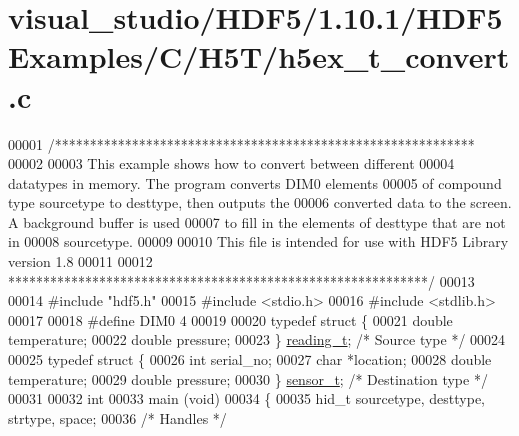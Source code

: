 \hypertarget{visual__studio_2_h_d_f5_21_810_81_2_h_d_f5_examples_2_c_2_h5_t_2h5ex__t__convert_8c_source}{}\section{visual\+\_\+studio/\+H\+D\+F5/1.10.1/\+H\+D\+F5\+Examples/\+C/\+H5\+T/h5ex\+\_\+t\+\_\+convert.c}
\label{visual__studio_2_h_d_f5_21_810_81_2_h_d_f5_examples_2_c_2_h5_t_2h5ex__t__convert_8c_source}

\begin{DoxyCode}
00001 \textcolor{comment}{/************************************************************}
00002 \textcolor{comment}{}
00003 \textcolor{comment}{  This example shows how to convert between different}
00004 \textcolor{comment}{  datatypes in memory.  The program converts DIM0 elements}
00005 \textcolor{comment}{  of compound type sourcetype to desttype, then outputs the}
00006 \textcolor{comment}{  converted data to the screen.  A background buffer is used}
00007 \textcolor{comment}{  to fill in the elements of desttype that are not in}
00008 \textcolor{comment}{  sourcetype.}
00009 \textcolor{comment}{}
00010 \textcolor{comment}{  This file is intended for use with HDF5 Library version 1.8}
00011 \textcolor{comment}{}
00012 \textcolor{comment}{ ************************************************************/}
00013 
00014 \textcolor{preprocessor}{#include "hdf5.h"}
00015 \textcolor{preprocessor}{#include <stdio.h>}
00016 \textcolor{preprocessor}{#include <stdlib.h>}
00017 
00018 \textcolor{preprocessor}{#define DIM0            4}
00019 
00020 \textcolor{keyword}{typedef} \textcolor{keyword}{struct }\{
00021     \textcolor{keywordtype}{double}  temperature;
00022     \textcolor{keywordtype}{double}  pressure;
00023 \} \hyperlink{structreading__t}{reading\_t};                                \textcolor{comment}{/* Source type */}
00024 
00025 \textcolor{keyword}{typedef} \textcolor{keyword}{struct }\{
00026     \textcolor{keywordtype}{int}     serial\_no;
00027     \textcolor{keywordtype}{char}    *location;
00028     \textcolor{keywordtype}{double}  temperature;
00029     \textcolor{keywordtype}{double}  pressure;
00030 \} \hyperlink{structsensor__t}{sensor\_t};                                 \textcolor{comment}{/* Destination type */}
00031 
00032 \textcolor{keywordtype}{int}
00033 main (\textcolor{keywordtype}{void})
00034 \{
00035     hid\_t       sourcetype, desttype, strtype, space;
00036                                             \textcolor{comment}{/* Handles */}

\end{DoxyCode}
